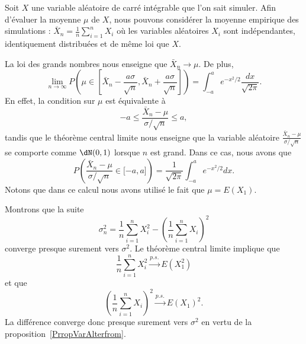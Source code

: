 \begin{example}
    Soit \( X\) une variable aléatoire de carré intégrable que l'on sait simuler. Afin d'évaluer la moyenne \( \mu\) de \( X\), nous pouvons considérer la moyenne empirique des simulations : \( \bar X_n=\frac{1}{ n }\sum_{i=1}^nX_i\) où les variables aléatoires \( X_i\) sont indépendantes, identiquement distribuées et de même loi que \( X\).

    La loi des grands nombres nous enseigne que \( \bar X_n\to\mu\). De plus,
    \begin{equation}
        \lim_{n\to \infty} P\left( \mu\in\left[ \bar X_n-\frac{ a\sigma }{ \sqrt{n} },\bar X_n+\frac{ a\sigma }{ \sqrt{n} } \right] \right)=\int_{-a}^a e^{-x^2/2}\frac{ dx }{ \sqrt{2\pi} }.
    \end{equation}
    En effet, la condition sur \( \mu\) est équivalente à
    \begin{equation}
        -a\leq \frac{ \bar X_n-\mu }{ \sigma/\sqrt{n} }\leq a,
    \end{equation}
    tandis que le théorème central limite nous enseigne que la variable aléatoire \( \frac{ \bar X_n-\mu }{ \sigma/\sqrt{n} }\) se comporte comme \( \dN(0,1)\) lorsque \( n\) est grand. Dans ce cas, nous avons que
    \begin{equation}
        P\left( \frac{ \bar X_n-\mu }{ \sigma/\sqrt{n} }\in\mathopen[ -a , a \mathclose] \right)=\frac{1}{ \sqrt{2\pi} }\int_{-a}^a e^{-x^2/2}dx.
    \end{equation}
    Notons que dans ce calcul nous avons utilisé le fait que \( \mu=E(X_1)\).

    Montrons que la suite
    \begin{equation}
        \sigma_n^2=\frac{1}{ n }\sum_{i=1}^nX_i^2-\left( \frac{1}{ n }\sum_{i=1}^nX_i \right)^2
    \end{equation}
    converge presque surement vers \( \sigma^2\). Le théorème central limite implique que
    \begin{equation}
        \frac{1}{ n }\sum_{i=1}^nX_i^2\stackrel{p.s.}{\longrightarrow} E(X_1^2)
    \end{equation}
    et que
    \begin{equation}
        \left( \frac{1}{ n }\sum_{i=1}^nX_i \right)^2\stackrel{p.s.}{\longrightarrow}E(X_1)^2.
    \end{equation}
    La différence converge donc presque surement vers \( \sigma^2\) en vertu de la proposition~\ref{PrropVarAlterfrom}.


\end{example}
